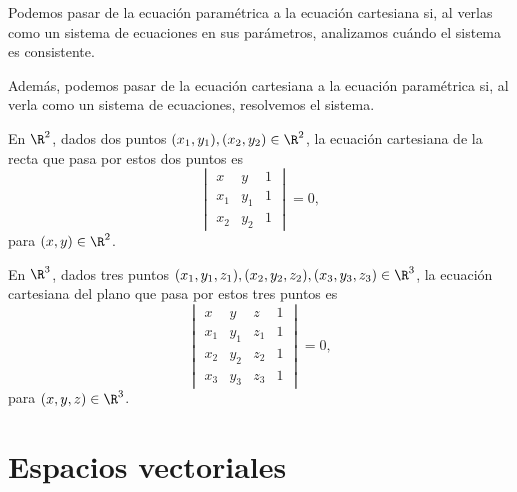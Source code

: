 \documentclass[a4,11pt]{aleph-notas}
\begin{document}
\begin{advertencia}
    Podemos pasar de la ecuación paramétrica a la ecuación cartesiana si, al verlas como un sistema de ecuaciones en sus parámetros, analizamos cuándo el sistema es consistente.
    
    Además, podemos pasar de la ecuación cartesiana a la ecuación paramétrica si, al verla como un sistema de ecuaciones, resolvemos el sistema.
\end{advertencia}

\begin{advertencia}
    En $\R^2$, dados dos puntos $(x_1,y_1),(x_2,y_2)\in\R^2$, la ecuación cartesiana de la recta que pasa por estos dos puntos es
    \[
        \begin{vmatrix}
            x & y & 1\\
            x_1 & y_1 & 1\\
            x_2 & y_2 & 1
        \end{vmatrix}
        = 0,
    \]
    para $(x,y)\in\R^2$.
\end{advertencia}

\begin{advertencia}
    En $\R^3$, dados tres puntos $(x_1,y_1,z_1),(x_2,y_2,z_2),(x_3,y_3,z_3)\in\R^3$, la ecuación cartesiana del plano que pasa por estos tres puntos es
    \[
        \begin{vmatrix}
            x & y & z & 1\\
            x_1 & y_1 & z_1 & 1\\
            x_2 & y_2 & z_2 & 1\\
            x_3 & y_3 & z_3 & 1
        \end{vmatrix}
        = 0,
    \]
    para $(x,y,z)\in\R^3$.
\end{advertencia}

\section{Espacios vectoriales}
\end{document}
